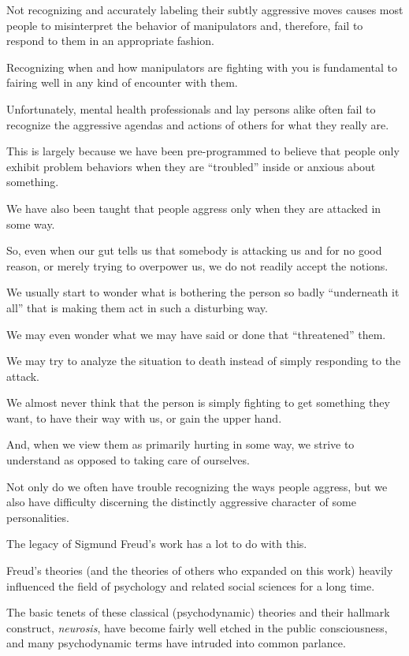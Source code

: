 \documentclass[oneside]{book}
\numberwithin{equation}{section}
\begin{document}
Not recognizing and accurately labeling their subtly aggressive moves causes most people to misinterpret the behavior of manipulators and, therefore, fail to respond to them in an appropriate fashion.

Recognizing when and how manipulators are fighting with you is fundamental to fairing well in any kind of encounter with them.

%
Unfortunately, mental health professionals and lay persons alike often fail to recognize the aggressive agendas and actions of others for what they really are.

This is largely because we have been pre-programmed to believe that people only exhibit problem behaviors when they are ``troubled'' inside or anxious about something.

We have also been taught that people aggress only when they are attacked in some way.

So, even when our gut tells us that somebody is attacking us and for no good reason, or merely trying to overpower us, we do not readily accept the notions.

We usually start to wonder what is bothering the person so badly ``underneath it all'' that is making them act in such a disturbing way.

We may even wonder what we may have said or done that ``threatened'' them.

We may try to analyze the situation to death instead of simply responding to the attack.

We almost never think that the person is simply fighting to get something they want, to have their way with us, or gain the upper hand.

And, when we view them as primarily hurting in some way, we strive to understand as opposed to taking care of ourselves.

%
Not only do we often have trouble recognizing the ways people aggress, but we also have difficulty discerning the distinctly aggressive character of some personalities.

The legacy of Sigmund Freud's work has a lot to do with this.

Freud's theories (and the theories of others who expanded on this work) heavily influenced the field of psychology and related social sciences for a long time.

The basic tenets of these classical (psychodynamic) theories and their hallmark construct, \textit{neurosis}, have become fairly well etched in the public consciousness, and many psychodynamic terms have intruded into common parlance.
\end{document}
